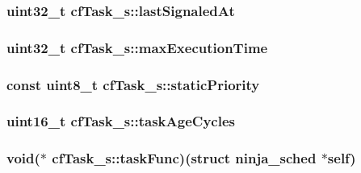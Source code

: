 \hypertarget{structcfTask__s_a7ee18c456eadd929d9408d7912301663}{
\subsubsection[{last\+Signaled\+At}]{\setlength{\rightskip}{0pt plus 5cm}uint32\+\_\+t cf\+Task\+\_\+s\+::last\+Signaled\+At}}\label{structcfTask__s_a7ee18c456eadd929d9408d7912301663}
\hypertarget{structcfTask__s_a45c57c3fd1504415d8fac7a8f5aa0f17}{
\subsubsection[{max\+Execution\+Time}]{\setlength{\rightskip}{0pt plus 5cm}uint32\+\_\+t cf\+Task\+\_\+s\+::max\+Execution\+Time}}\label{structcfTask__s_a45c57c3fd1504415d8fac7a8f5aa0f17}
\hypertarget{structcfTask__s_ac13ee939e38c25a4d55d9fa1ca91431b}{
\subsubsection[{static\+Priority}]{\setlength{\rightskip}{0pt plus 5cm}const uint8\+\_\+t cf\+Task\+\_\+s\+::static\+Priority}}\label{structcfTask__s_ac13ee939e38c25a4d55d9fa1ca91431b}
\hypertarget{structcfTask__s_ad7fc05ee0ef2f1c24aeffe48ecccba8b}{
\subsubsection[{task\+Age\+Cycles}]{\setlength{\rightskip}{0pt plus 5cm}uint16\+\_\+t cf\+Task\+\_\+s\+::task\+Age\+Cycles}}\label{structcfTask__s_ad7fc05ee0ef2f1c24aeffe48ecccba8b}
\hypertarget{structcfTask__s_abebc1afeb90952b2f2f3965ae62e893e}{
\subsubsection[{task\+Func}]{\setlength{\rightskip}{0pt plus 5cm}void($\ast$ cf\+Task\+\_\+s\+::task\+Func)(struct {\bf ninja\+\_\+sched} $\ast$self)}}\label{structcfTask__s_abebc1afeb90952b2f2f3965ae62e893e}
